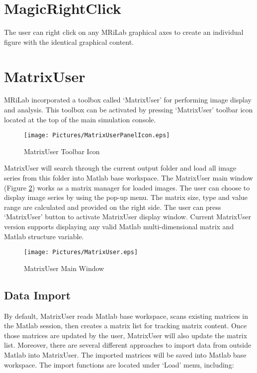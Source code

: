 \documentclass{book}%
\begin{document}
\section{MagicRightClick}
The user can right click on any MRiLab graphical axes to create an individual figure with the identical graphical content.

\section{MatrixUser}
MRiLab incorporated a toolbox called `MatrixUser' for performing image display and analysis. This toolbox can be activated by pressing `MatrixUser' toolbar icon located at the top of the main simulation console.

\begin{figure}[htbp]
	\centering
		\texttt{[image: Pictures/MatrixUserPanelIcon.eps]}
	\caption{MatrixUser Toolbar Icon}
	\label{fig:MatrixUserPanelIcon}
\end{figure}

MatrixUser will search through the current output folder and load all image series from this folder into Matlab base workspace. The MatrixUser main window (Figure \ref{fig:MatrixUser}) works as a matrix manager for loaded images. The user can choose to display image series by using the pop-up menu. The matrix size, type and value range are calculated and provided on the right side. The user can press `MatrixUser' button to activate MatrixUser display window. Current MatrixUser version supports displaying any valid Matlab multi-dimensional matrix and Matlab structure variable.

\begin{figure}[htbp]
	\centering
		\texttt{[image: Pictures/MatrixUser.eps]}
	\caption{MatrixUser Main Window}
	\label{fig:MatrixUser}
\end{figure}


\subsection{Data Import}

By default, MatrixUser reads Matlab base workspace, scans existing matrices in the Matlab session, then creates a matrix list for tracking matrix content. Once those matrices are updated by the user, MatrixUser will also update the matrix list. Moreover, there are several different approaches to import data from outside Matlab into MatrixUser. The imported matrices will be saved into Matlab base workspace. The import functions are located under `Load' menu, including:
\end{document}
